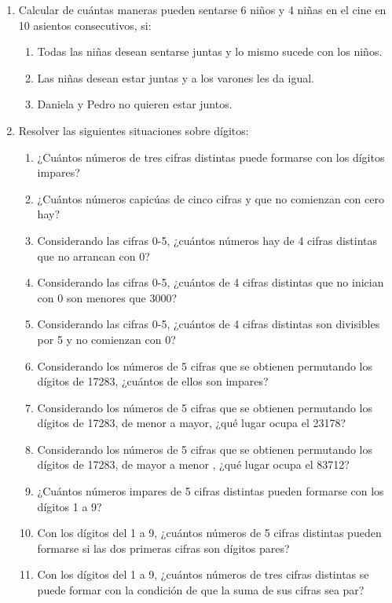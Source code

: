 \documentclass[a4paper]{article}
\newcommand{\exercise}{\item}
\begin{document}
\begin{enumerate}
\begin{enumerate} [label=(\alph*)]
	\end{enumerate}
	\exercise Calcular de cuántas maneras pueden sentarse 6 niños y 4 niñas en el cine en 10 asientos consecutivos, si:
	\begin{enumerate} [label=(\alph*)]
		\item Todas las niñas desean sentarse juntas y lo mismo sucede con los niños.
		\item Las niñas desean estar juntas y a los varones les da igual.
		\item Daniela y Pedro no quieren estar juntos.
	\end{enumerate}
	\exercise Resolver las siguientes situaciones sobre dígitos:
	\begin{enumerate} [label=(\alph*)]
		\item ¿Cuántos números de tres cifras distintas puede formarse con los dígitos impares?
		\item ¿Cuántos números capicúas de cinco cifras y que no comienzan con cero hay?
		\item Considerando las cifras 0-5, ¿cuántos números hay de 4 cifras distintas que no arrancan con 0?
		\item Considerando las cifras 0-5, ¿cuántos de 4 cifras distintas que no inician con 0 son menores que 3000?
		\item Considerando las cifras 0-5, ¿cuántos de 4 cifras distintas son divisibles por 5 y no comienzan con 0?
		\item Considerando los números de 5 cifras que se obtienen permutando los dígitos de 17283, ¿cuántos de ellos son impares?
		\item Considerando los números de 5 cifras que se obtienen permutando los dígitos de 17283, de menor a mayor, ¿qué lugar ocupa el 23178?
		\item Considerando los números de 5 cifras que se obtienen permutando los dígitos de 17283, de mayor a menor , ¿qué lugar ocupa el 83712?
		\item ¿Cuántos números impares de 5 cifras distintas pueden formarse con los dígitos 1 a 9?
		\item Con los dígitos del 1 a 9, ¿cuántos números de 5 cifras distintas pueden formarse si las dos primeras cifras son dígitos pares?
		\item Con los dígitos del 1 a 9, ¿cuántos números de tres cifras distintas se puede formar con la condición de que la suma de sus cifras sea par?

\end{enumerate}
\end{enumerate}
\end{document}
